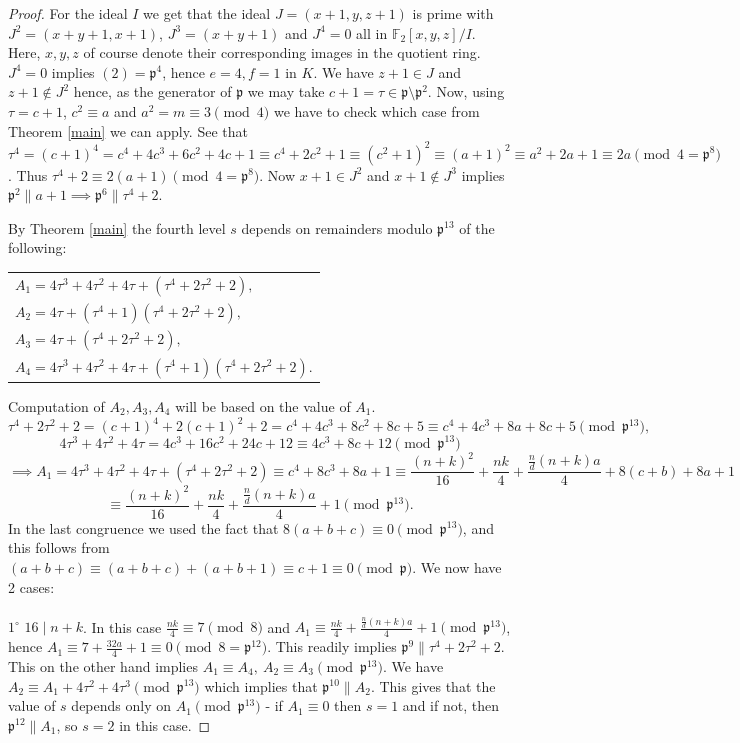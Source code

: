 \documentclass[12pt]{article}
\theoremstyle{remark}
\newcommand{\p}{\mathfrak{p}}
\begin{document}
\begin{proof}
For the ideal $I$ we get that the ideal $J =  (x+1,y,z+1)$ is prime with $J^2 = (x+y+1,x+1)$, $J^3 = (x+y+1)$ and $J^4= 0$ all in $\mathbb{F}_2[x,y,z]/I$. Here, $x,y,z$ of course denote their corresponding images in the quotient ring. $J^4= 0$ implies $(2) = \mathfrak{p}^4$, hence $e=4,f=1$ in $K$. We have  $z+1 \in J$ and $z+1 \not\in J^2$ hence, as the generator of $\p$ we may take $ c+1 = \tau \in \mathfrak{p}\setminus\mathfrak{p}^2$. Now, using $\tau = c+1$, $c^2 \equiv a$ and $a^2 = m \equiv 3 \pmod{4}$ we have to check which case from Theorem \ref{main} we can apply. See that $\tau^4 = (c+1)^4 = c^4+4c^3+6c^2+4c+1 \equiv c^4+2c^2+1 \equiv (c^2+1)^2 \equiv  (a+1)^2 \equiv a^2+2a+1 \equiv 2a \pmod{4 = \mathfrak{p}^8}$. Thus $\tau^4+2 \equiv 2(a+1) \pmod{4 = \mathfrak{p}^8}$. Now $x+1 \in J^2$ and $x+1 \not\in J^3$ implies $\mathfrak{p}^2 \parallel a+1 \implies \mathfrak{p}^6 \parallel \tau^4+2$.


By Theorem \ref{main} the fourth level $s$ depends on remainders modulo $\mathfrak{p}^{13}$ of the following:
\begin{center}
\begin{tabular}{@{}l@{}}
    $A_1 = 4\tau^3+4\tau^2+4\tau+(\tau^4+2\tau^2+2),$\\
    $A_2 = 4\tau + (\tau^4+1)(\tau^4+2\tau^2+2),$\\
    $A_3 = 4\tau + (\tau^4+2\tau^2+2), $\\
    $A_4= 4\tau^3+4\tau^2+4\tau+(\tau^4+1)(\tau^4+2\tau^2+2). $
\end{tabular}
\end{center}
Computation of $A_2,A_3,A_4$ will be based on the value of $A_1$.
\[\tau^4+2\tau^2+2 = (c+1)^4 + 2(c+1)^2+2 = c^4 + 4c^3 + 8c^2+8c+5 \equiv c^4+ 4c^3+8a+8c+5 \pmod{\mathfrak{p}^{13}},\]
\[4\tau^3 + 4\tau^2 + 4\tau = 4c^3+16c^2+24c+12 \equiv 4c^3+8c+12 \pmod{\mathfrak{p}^{13}} \]
\[ \implies A_1 = 4\tau^3+4\tau^2+4\tau+(\tau^4+2\tau^2+2) \equiv c^4+8c^3+8a+1 \equiv   \frac{(n+k)^2}{16} + \frac{nk}{4} + \frac{\frac{n}{d}(n+k)a}{4} + 8(c+b) + 8a + 1 \]
\[ \equiv \frac{(n+k)^2}{16} + \frac{nk}{4} + \frac{\frac{n}{d}(n+k)a}{4} + 1  \pmod{\mathfrak{p}^{13}}. \]
In the last congruence we used the fact that $8(a+b+c) \equiv 0 \pmod{\mathfrak{p}^{13}}$, and this follows from $(a+b+c) \equiv (a+b+c) + (a+b+1) \equiv c+1 \equiv 0 \pmod{\mathfrak{p}}$. We now have 2 cases:
\\ \\
$1^{\circ}$ $16 \mid n+k$. In this case $\frac{nk}{4} \equiv 7 \pmod{8}$ and $A_1 \equiv \frac{nk}{4} + \frac{\frac{n}{d}(n+k)a}{4} + 1  \pmod{\mathfrak{p}^{13}}$, hence $A_1 \equiv 7 + \frac{32a}{4}+ 1 \equiv 0 \pmod{8 = \mathfrak{p}^{12}}$. This readily implies $\mathfrak{p}^{9} \parallel \tau^4+2\tau^2+2$. This on the other hand implies $A_1 \equiv A_4, \  A_2 \equiv A_3 \pmod{\mathfrak{p}^{13}}$. We have $A_2 \equiv A_1 + 4\tau^2+4\tau^3 \pmod{\mathfrak{p}^{13}}$ which implies that $\mathfrak{p}^{10} \parallel A_2$. This gives that the value of $s$ depends only on $A_1 \pmod{\mathfrak{p}^{13}}$ - if $A_1 \equiv 0$ then $s=1$ and if not, then $\mathfrak{p}^{12} \parallel A_1$, so $s=2$ in this case.




\end{proof}
\end{document}
